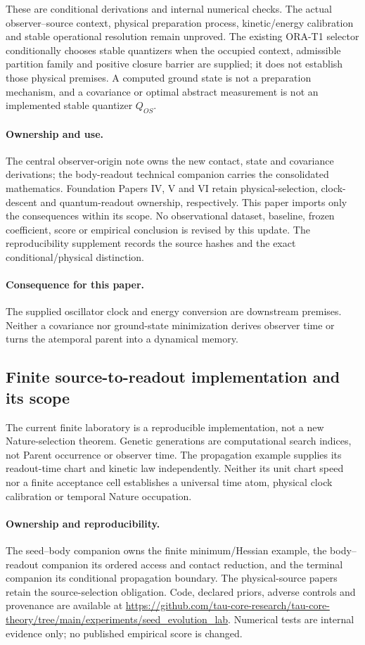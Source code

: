 \documentclass[11pt]{article}
\begin{document}
These are conditional derivations and internal numerical checks. The actual
observer--source context, physical preparation process, kinetic/energy
calibration and stable operational resolution remain unproved. The existing
ORA-T1 selector conditionally chooses stable quantizers when the occupied
context, admissible partition family and positive closure barrier are supplied;
it does not establish those physical premises. A computed ground state is not
a preparation mechanism, and a covariance or optimal abstract measurement is
not an implemented stable quantizer $Q_{OS}$.

\paragraph{Ownership and use.}
The central observer-origin note owns the new contact, state and covariance
derivations; the body-readout technical companion carries the consolidated
mathematics. Foundation Papers IV, V and VI retain physical-selection,
clock-descent and quantum-readout ownership, respectively. This paper imports
only the consequences within its scope. No observational dataset, baseline,
frozen coefficient, score or empirical conclusion is revised by this update.
The reproducibility supplement records the source hashes and the exact
conditional/physical distinction.


\paragraph{Consequence for this paper.}
The supplied oscillator clock and energy conversion are downstream premises. Neither a covariance nor ground-state minimization derives observer time or turns the atemporal parent into a dynamical memory.

\subsection{Finite source-to-readout implementation and its scope}
The current finite laboratory is a reproducible implementation, not a new Nature-selection theorem. Genetic generations are computational search indices, not Parent occurrence or observer time. The propagation example supplies its readout-time chart and kinetic law independently. Neither its unit chart speed nor a finite acceptance cell establishes a universal time atom, physical clock calibration or temporal Nature occupation.
\paragraph{Ownership and reproducibility.}
The seed--body companion owns the finite minimum/Hessian example, the body--readout companion its ordered access and contact reduction, and the terminal companion its conditional propagation boundary. The physical-source papers retain the source-selection obligation. Code, declared priors, adverse controls and provenance are available at \url{https://github.com/tau-core-research/tau-core-theory/tree/main/experiments/seed_evolution_lab}. Numerical tests are internal evidence only; no published empirical score is changed.
\end{document}
